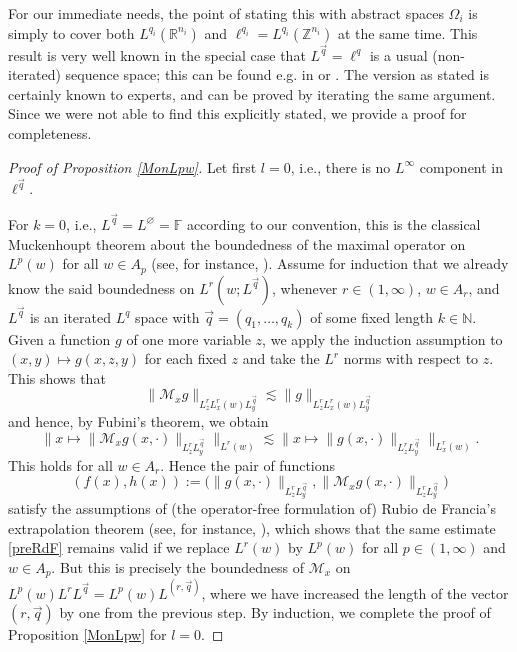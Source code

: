 \documentclass[11pt, reqno]{amsart}
\theoremstyle{definition}
\theoremstyle{remark}
\numberwithin{equation}{section}
\newcommand{\F}{\mathbb F}
\newcommand{\N}{\mathbb N}
\newcommand{\R}{\mathbb R}
\newcommand{\Z}{\mathbb Z}
\newcommand{\vq}{\vec q}
\newcommand{\Norm}[2]{\|#1\|_{#2}}
\newcommand{\BNorm}[2]{\Big\|#1\Big\|_{#2}}
\begin{document}
For our immediate needs, the point of stating this with abstract spaces $\Omega_i$ is simply to cover both $L^{q_i}(\R^{n_i})$ and $\ell^{q_i}=L^{q_i}(\Z^{n_i})$ at the same time. This result is very well known in the special case that $L^{\vq}=\ell^q$ is a usual (non-iterated) sequence space; this can be found e.g. in \cite[page 62]{CUMP:book} or \cite[Theorem 8.2.6]{HNVW2}. The version as stated is certainly known to experts, and can be proved by iterating the same argument. Since we were not able to find this explicitly stated, we provide a proof for completeness.

\begin{proof}[Proof of Proposition \ref{MonLpw}]
Let first $l=0$, i.e., there is no $L^\infty$ component in $\ell^{\vq}$.

For $k=0$, i.e., $L^{\vq}=L^{\varnothing}=\F$ according to our convention, this is the classical Muckenhoupt theorem about the boundedness of the maximal operator on $L^p(w)$ for all $w\in A_p$ (see, for instance, \cite[Theorem J.1.1]{HNVW2}). Assume for induction that we already know the said boundedness on $L^r(w;L^{\vq})$, whenever $r\in(1,\infty)$, $w\in A_r$, and $L^{\vq}$ is an iterated $L^q$ space with $\vq=(q_1,\ldots,q_k)$ of some fixed length $k\in\N$. Given a function $g$ of one more variable $z$, we apply the induction assumption to $(x,y)\mapsto g(x,z,y)$ for each fixed $z$ and take the $L^r$ norms with respect to $z$. This shows that
\begin{equation*}
\Norm{\mathcal M_x g}{L^r_z L^r_x(w) L^{\vq}_y}\lesssim  \Norm{g}{L^r_z L^r_x(w) L^{\vq}_y}
\end{equation*}
and hence, by Fubini's theorem, we obtain
\begin{equation}\label{preRdF}
\BNorm{x\mapsto  \Norm{\mathcal M_x g(x,\cdot)}{ L^r_z  L^{\vq}_y}}{L^r(w)}
\lesssim  \BNorm{x\mapsto \Norm{g(x,\cdot)}{  L^r_z L^{\vq}_y} }{L^r_x(w)}.
\end{equation}
This holds for all $w\in A_r$. Hence the pair of functions
\begin{equation*}
(f(x),h(x)):=\Big( \Norm{g(x,\cdot)}{  L^r_z L^{\vq}_y}, \Norm{\mathcal M_x g(x,\cdot)}{ L^r_z  L^{\vq}_y} \Big)
\end{equation*}
satisfy the assumptions of (the operator-free formulation of) Rubio de Francia's extrapolation theorem (see, for instance, \cite[Theorem J.2.1]{HNVW2}), which shows that the same estimate \eqref{preRdF} remains valid if we replace $L^r(w)$ by $L^p(w)$ for all $p\in(1,\infty)$ and $w\in A_p$. But this is precisely the boundedness of $\mathcal M_x$ on $L^p(w)L^r L^{\vq}=L^p(w)L^{(r,\vq)}$, where we have increased the length of the vector $(r,\vq)$ by one from the previous step.
By induction, we complete the proof of Proposition \ref{MonLpw} for $l=0$.


\end{proof}
\end{document}
